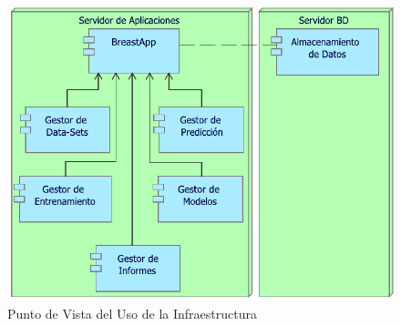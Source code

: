 \begin{figure}[h!]
	\centering
	\includegraphics[width=1\linewidth]{ARQUITECTURA/imgs/CapaTecnologia/2_PvUsoInfraestructuraTec}
	\caption{Punto de Vista del Uso de la Infraestructura}
	\label{PvUsoInfraestructura}
\end{figure}


